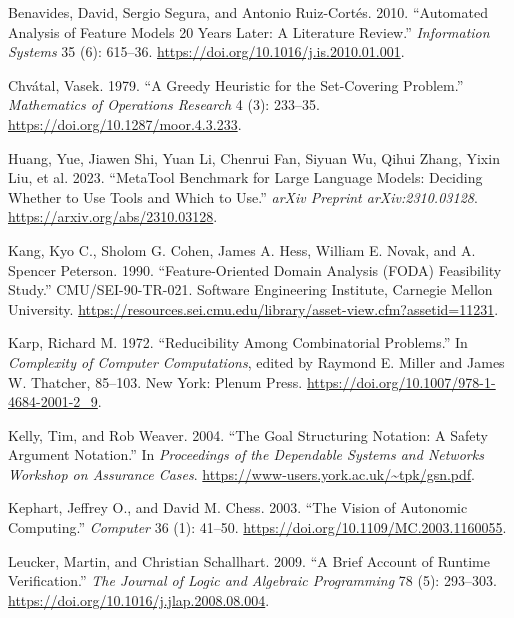 \documentclass[
  10pt,
]{article}
\newlength{\cslhangindent}
\newenvironment{CSLReferences}[2] %
 {\begin{list}{}{%
  \setlength{\itemindent}{0pt}
  \setlength{\leftmargin}{0pt}
  \setlength{\parsep}{0pt}
  \ifodd #1
   \setlength{\leftmargin}{\cslhangindent}
   \setlength{\itemindent}{-1\cslhangindent}
  \fi
  \setlength{\itemsep}{#2\baselineskip}}}
 {\end{list}}
\begin{document}
\protect{}\label{refs}
\begin{CSLReferences}{1}{0}
Benavides, David, Sergio Segura, and Antonio Ruiz-Cortés. 2010.
{``Automated Analysis of Feature Models 20 Years Later: A Literature
Review.''} \emph{Information Systems} 35 (6): 615--36.
\url{https://doi.org/10.1016/j.is.2010.01.001}.

Chvátal, Vasek. 1979. {``A Greedy Heuristic for the Set-Covering
Problem.''} \emph{Mathematics of Operations Research} 4 (3): 233--35.
\url{https://doi.org/10.1287/moor.4.3.233}.

Huang, Yue, Jiawen Shi, Yuan Li, Chenrui Fan, Siyuan Wu, Qihui Zhang,
Yixin Liu, et al. 2023. {``MetaTool Benchmark for Large Language Models:
Deciding Whether to Use Tools and Which to Use.''} \emph{arXiv Preprint
arXiv:2310.03128}. \url{https://arxiv.org/abs/2310.03128}.

Kang, Kyo C., Sholom G. Cohen, James A. Hess, William E. Novak, and A.
Spencer Peterson. 1990. {``Feature-Oriented Domain Analysis ({FODA})
Feasibility Study.''} CMU/SEI-90-TR-021. Software Engineering Institute,
Carnegie Mellon University.
\url{https://resources.sei.cmu.edu/library/asset-view.cfm?assetid=11231}.

Karp, Richard M. 1972. {``Reducibility Among Combinatorial Problems.''}
In \emph{Complexity of Computer Computations}, edited by Raymond E.
Miller and James W. Thatcher, 85--103. New York: Plenum Press.
\url{https://doi.org/10.1007/978-1-4684-2001-2_9}.

Kelly, Tim, and Rob Weaver. 2004. {``The Goal Structuring Notation: A
Safety Argument Notation.''} In \emph{Proceedings of the Dependable
Systems and Networks Workshop on Assurance Cases}.
\url{https://www-users.york.ac.uk/~tpk/gsn.pdf}.

Kephart, Jeffrey O., and David M. Chess. 2003. {``The Vision of
Autonomic Computing.''} \emph{Computer} 36 (1): 41--50.
\url{https://doi.org/10.1109/MC.2003.1160055}.

Leucker, Martin, and Christian Schallhart. 2009. {``A Brief Account of
Runtime Verification.''} \emph{The Journal of Logic and Algebraic
Programming} 78 (5): 293--303.
\url{https://doi.org/10.1016/j.jlap.2008.08.004}.


\end{CSLReferences}
\end{document}
